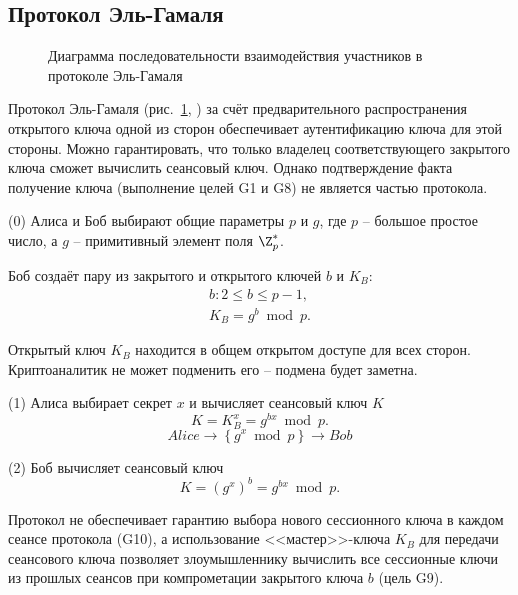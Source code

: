 \subsection{Протокол Эль-Гамаля}

\begin{figure}[thb]
	\centering
	\begin{sequencediagram}

	\end{sequencediagram}
	\caption{Диаграмма последовательности взаимодействия участников в протоколе Эль-Гамаля\label{fig:key_distribution-el-gamal}}
\end{figure}

Протокол Эль-Гамаля (рис.~\ref{fig:key_distribution-el-gamal}, \cite{ElGamal:1984, ElGamal:1985}) за счёт предварительного распространения открытого ключа одной из сторон обеспечивает аутентификацию ключа для этой стороны. Можно гарантировать, что только владелец соответствующего закрытого ключа сможет вычислить сеансовый ключ. Однако подтверждение факта получение ключа (выполнение целей G1 и G8) не является частью протокола.

\begin{protocol}
    \item[(0)] Алиса и Боб выбирают общие параметры $p$ и $g$, где $p$ -- большое простое число, а $g$ -- примитивный элемент поля $\Z_p^*$.
    \item[{}] Боб создаёт пару из закрытого и открытого ключей $b$ и $K_B$:
        \[\begin{array}{l}
            b: 2 \leq b \leq p - 1, \\
            K_B = g^b \bmod p.
        \end{array}\]
    \item[{}] Открытый ключ $K_B$ находится в общем открытом доступе для всех сторон. Криптоаналитик не может подменить его -- подмена будет заметна.
    \item[(1)] Алиса выбирает секрет $x$ и вычисляет сеансовый ключ $K$
        \[ K = K_B^{x} = g^{bx} \bmod p. \]
        \[ Alice \to \left\{ g^x \bmod p \right\} \to Bob\]
    \item[(2)] Боб вычисляет сеансовый ключ
        \[ K = (g^x)^{b} = g^{bx} \bmod p. \]
\end{protocol}

Протокол не обеспечивает гарантию выбора нового сессионного ключа в каждом сеансе протокола (G10), а использование <<мастер>>-ключа $K_B$ для передачи сеансового ключа позволяет злоумышленнику вычислить все сессионные ключи из прошлых сеансов при компрометации закрытого ключа $b$ (цель G9).

